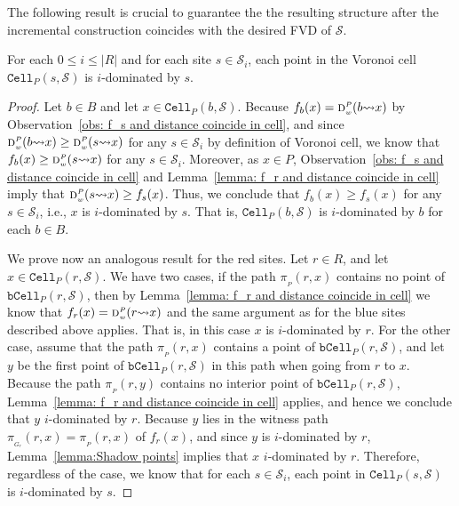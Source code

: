 \documentclass[a4paper,UKenglish]{socg-lipics-v2018}
\newcommand{\idom}[1][i]{${#1}$-dominated\xspace}
\newcommand{\s}{\mathcal S}
\newcommand{\dd}[3][P]{\ensuremath{\textsc{d}_{\scriptscriptstyle w}^{\scriptscriptstyle #1}(#2 {\leadsto} #3)}}
\newcommand{\p}[3][P]{\ensuremath{\pi_{_{#1}}(#2, #3)}}
\newcommand{\cell}[2][P]{\ensuremath{\mathtt{Cell}_{\scriptscriptstyle #1}(#2)}}
\newcommand{\bcell}[2][P]{\ensuremath{\mathtt{bCell}_{\scriptscriptstyle #1}(#2)}}
\begin{document}
The following result is crucial to guarantee the the resulting structure after the incremental construction coincides with the desired FVD of $\s$.

\begin{lemma}\label{lemma:Patch contains vcell} 
For each $0\leq i \leq |R|$ and for each site $s\in \s_i$, 
each point in the Voronoi cell $\cell{s, \s}$ is \idom by $s$.
\end{lemma}
\begin{proof}
Let $b\in B$ and let $x\in \cell{b, \s}$. 
Because $f_b(x) = \dd{b}{x}$ by Observation~\ref{obs: f_s and distance coincide in cell}, and since $\dd{b}{x} \geq \dd{s}{x}$ for any $s\in \s_i$ by definition of Voronoi cell, we know that $f_b(x) \geq \dd{s}{x}$ for any $s\in \s_i$. Moreover, as $x\in P$, Observation~\ref{obs: f_s and distance coincide in cell} and Lemma~\ref{lemma: f_r and distance coincide in cell} imply that $\dd{s}{x} \geq f_s(x)$. 
Thus, we conclude that $f_b(x) \geq f_s(x)$ for any $s\in \s_i$, i.e., $x$ is \idom by $s$. That is, $\cell{b, \s}$ is \idom by $b$ for each $b\in B$.

We prove now an analogous result for the red sites.
Let $r\in R$, and let $x\in \cell{r, \s}$.  We have two cases, if the path $\p{r}{x}$ contains no point of $\bcell{r, \s}$, then by Lemma~\ref{lemma: f_r and distance coincide in cell} we know that $f_r(x) = \dd{r}{x}$ and the same argument as for the blue sites described above applies. That is, in this case $x$ is \idom by $r$.
For the other case, assume that the path $\p{r}{x}$ contains a point of $\bcell{r, \s}$, and let $y$ be the first point of $\bcell{r, \s}$ in this path when going from $r$ to $x$.
Because the path $\p{r}{y}$ contains no interior point of $\bcell{r, \s}$, Lemma~\ref{lemma: f_r and distance coincide in cell} applies, and hence we conclude that $y$ \idom by $r$.
Because $y$ lies in the witness path $\p[G_r]{r}{x} = \p{r}{x}$ of $f_r(x)$, and since $y$ is \idom by $r$, Lemma~\ref{lemma:Shadow points} implies that $x$ \idom by $r$.
Therefore, regardless of the case, we know that for each $s\in \s_i$, each point in $\cell{s, \s}$ is \idom by $s$.
\end{proof}
\end{document}
